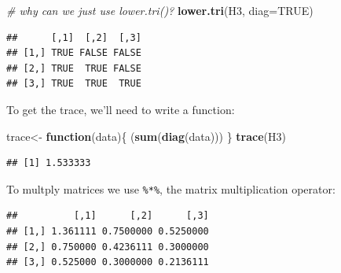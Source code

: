 \documentclass[]{article}
\newenvironment{Shaded}{\begin{snugshade}}{\end{snugshade}}
\newcommand{\KeywordTok}[1]{\textcolor[rgb]{0.13,0.29,0.53}{\textbf{#1}}}
\newcommand{\DataTypeTok}[1]{\textcolor[rgb]{0.13,0.29,0.53}{#1}}
\newcommand{\DecValTok}[1]{\textcolor[rgb]{0.00,0.00,0.81}{#1}}
\newcommand{\StringTok}[1]{\textcolor[rgb]{0.31,0.60,0.02}{#1}}
\newcommand{\CommentTok}[1]{\textcolor[rgb]{0.56,0.35,0.01}{\textit{#1}}}
\newcommand{\OtherTok}[1]{\textcolor[rgb]{0.56,0.35,0.01}{#1}}
\newcommand{\ControlFlowTok}[1]{\textcolor[rgb]{0.13,0.29,0.53}{\textbf{#1}}}
\newcommand{\OperatorTok}[1]{\textcolor[rgb]{0.81,0.36,0.00}{\textbf{#1}}}
\newcommand{\NormalTok}[1]{#1}
\begin{document}
\begin{Shaded}
\begin{Highlighting}[]
\CommentTok{# why can we just use lower.tri()?}
\KeywordTok{lower.tri}\NormalTok{(H3, }\DataTypeTok{diag=}\OtherTok{TRUE}\NormalTok{)}
\end{Highlighting}
\end{Shaded}

\begin{verbatim}
##      [,1]  [,2]  [,3]
## [1,] TRUE FALSE FALSE
## [2,] TRUE  TRUE FALSE
## [3,] TRUE  TRUE  TRUE
\end{verbatim}

To get the trace, we'll need to write a function:

\begin{Shaded}
\begin{Highlighting}[]
\NormalTok{trace<-}\StringTok{ }\ControlFlowTok{function}\NormalTok{(data)\{}
\NormalTok{  (}\KeywordTok{sum}\NormalTok{(}\KeywordTok{diag}\NormalTok{(data)))}
\NormalTok{\}}
\KeywordTok{trace}\NormalTok{(H3)}
\end{Highlighting}
\end{Shaded}

\begin{verbatim}
## [1] 1.533333
\end{verbatim}

To multply matrices we use \texttt{\%*\%}, the matrix multiplication
operator:

\begin{Shaded}
\end{Shaded}

\begin{verbatim}
##          [,1]      [,2]      [,3]
## [1,] 1.361111 0.7500000 0.5250000
## [2,] 0.750000 0.4236111 0.3000000
## [3,] 0.525000 0.3000000 0.2136111
\end{verbatim}

\begin{Shaded}
\end{Shaded}
\end{document}
